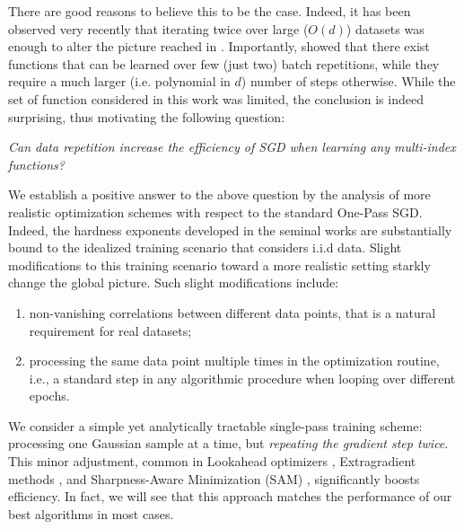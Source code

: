 There are good reasons to believe this to be the case. Indeed, it has been observed very recently \citep{dandi2024benefits} that iterating twice over large ($O(d)$) datasets was enough to alter the picture reached in 
\cite{arous2021online,abbe2022merged,abbe2023sgd}. Importantly, \cite{dandi2024benefits} showed that there exist functions that can be learned over few (just two) batch repetitions, while they require a much larger (i.e. polynomial in $d$) number of steps otherwise.
While the set of function considered in this work was limited, the conclusion is indeed surprising, thus motivating the following question: 
\begin{center}
\textit{
Can data repetition increase the efficiency of SGD when learning any multi-index functions?
} 
\end{center}

We establish a positive answer to the above question by the analysis of more realistic optimization schemes with respect to the standard One-Pass SGD. Indeed, the hardness exponents developed in the seminal works \cite{abbe2021staircase,arous2021online} are substantially bound to the idealized training scenario that considers i.i.d data. Slight modifications to this training scenario toward a more realistic setting starkly change the global picture. Such slight modifications include:\begin{enumerate}
    \item non-vanishing correlations between different data points, that is a natural requirement for real datasets;
    \item processing the same data point multiple times in the optimization routine, i.e., a standard step in any algorithmic procedure when looping over different epochs. 
\end{enumerate}

We consider a simple yet analytically tractable single-pass training scheme: processing one Gaussian sample at a time, but \emph{repeating the gradient step twice}. This minor adjustment, common in Lookahead optimizers \citep{zhang2019lookahead}, Extragradient methods \citep{korpelevi1976extragradient}, and Sharpness-Aware Minimization (SAM) \citep{foret2021sharpness}, significantly boosts efficiency. In fact, we will see that this approach matches the performance of our best algorithms in most cases.

